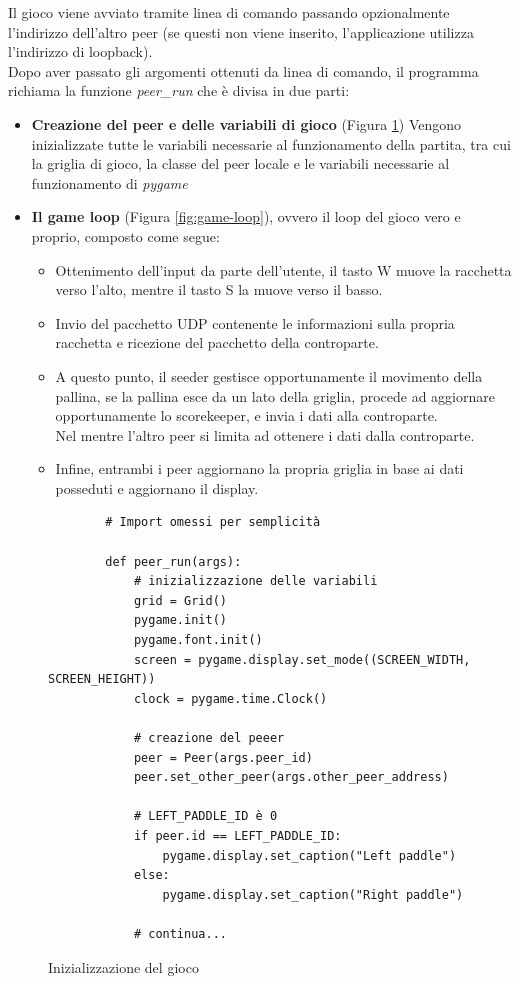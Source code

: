 Il gioco viene avviato tramite linea di comando passando opzionalmente l'indirizzo dell'altro peer
(se questi non viene inserito, l'applicazione utilizza l'indirizzo di loopback). \\
Dopo aver passato gli argomenti ottenuti da linea di comando, il programma richiama la funzione \textit{peer\_run}
che è divisa in due parti:
\begin{itemize}
    \item \textbf{Creazione del peer e delle variabili di gioco} (Figura \ref{fig:inizializzazione})
    Vengono inizializzate tutte le variabili necessarie al funzionamento della partita, tra cui la griglia di gioco,
    la classe del peer locale e le variabili necessarie al funzionamento di \textit{pygame}
    \item \textbf{Il game loop} (Figura \ref{fig:game-loop}), ovvero il loop del gioco vero e proprio, composto come segue:
    \begin{itemize}
        \item Ottenimento dell'input da parte dell'utente, il tasto W muove la racchetta verso l'alto, mentre il
        tasto S la muove verso il basso.
        \item Invio del pacchetto UDP contenente le informazioni sulla propria racchetta e ricezione del pacchetto
        della controparte.
        \item A questo punto, il seeder gestisce opportunamente il movimento della pallina, se la pallina esce
        da un lato della griglia, procede ad aggiornare opportunamente lo scorekeeper, e invia i dati alla controparte. \\
        Nel mentre l'altro peer si limita ad ottenere i dati dalla controparte.
        \item Infine, entrambi i peer aggiornano la propria griglia in base ai dati posseduti e aggiornano il display.
    \end{itemize}
\end{itemize}

\begin{figure}
    \begin{verbatim}
        # Import omessi per semplicità

        def peer_run(args):
            # inizializzazione delle variabili
            grid = Grid()
            pygame.init()
            pygame.font.init()
            screen = pygame.display.set_mode((SCREEN_WIDTH, SCREEN_HEIGHT))
            clock = pygame.time.Clock()

            # creazione del peeer
            peer = Peer(args.peer_id)
            peer.set_other_peer(args.other_peer_address)

            # LEFT_PADDLE_ID è 0
            if peer.id == LEFT_PADDLE_ID:
                pygame.display.set_caption("Left paddle")
            else:
                pygame.display.set_caption("Right paddle")

            # continua...
    \end{verbatim}
    \caption{Inizializzazione del gioco}
    \label{fig:inizializzazione}
\end{figure}

